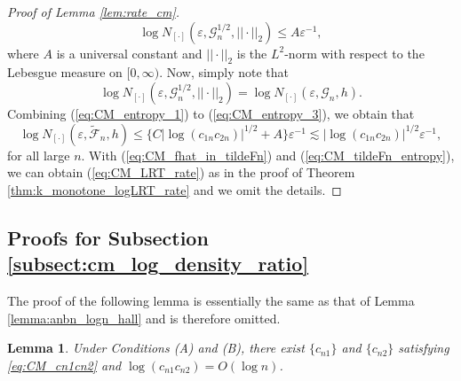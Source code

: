 \documentclass[12pt,letterpaper, twoside, openany]{article}
\theoremstyle{plain}
\newtheorem{lemma}[theorem]{Lemma}
\begin{document}
\begin{proof}[Proof of Lemma \ref{lem:rate_cm}]
\begin{equation}\label{eq:CM_entropy_2}
	\log N_{[\cdot]}(\varepsilon, 	\mathcal{G}^{1/2}_n, ||\cdot||_2) \leq A \varepsilon^{-1},
\end{equation}
where $A$ is a universal constant and $||\cdot||_2$ is the $L^2$-norm with respect to the Lebesgue measure on $[0, \infty)$. Now, simply note that
\begin{equation}\label{eq:CM_entropy_3}
	\log N_{[\cdot]}(\varepsilon, 	\mathcal{G}^{1/2}_n, ||\cdot||_2) = \log N_{[\cdot]}(\varepsilon, \mathcal{G}_n, h).
\end{equation}
Combining (\ref{eq:CM_entropy_1}) to (\ref{eq:CM_entropy_3}), we obtain that
\begin{equation}\label{eq:CM_tildeFn_entropy}
	\log N_{[\cdot]}(\varepsilon, 	\tilde{\mathcal{F}}_n, h) \leq  \{C |\log (c_{1n}c_{2n})|^{1/2} + A\} \varepsilon^{-1} \lesssim |\log (c_{1n}c_{2n})|^{1/2} \varepsilon^{-1},
\end{equation}
for all large $n$. With (\ref{eq:CM_fhat_in_tildeFn}) and (\ref{eq:CM_tildeFn_entropy}), we can obtain (\ref{eq:CM_LRT_rate}) as in the proof of Theorem \ref{thm:k_monotone_logLRT_rate} and we omit the details.	
\end{proof}



%

\subsection{Proofs for Subsection \ref{subsect:cm_log_density_ratio}}
The proof of the following lemma is essentially the same as that of Lemma \ref{lemma:anbn_logn_hall} and is therefore omitted.
\begin{lemma}\label{lemma:cn1cn2_logn_hall}
    Under Conditions (A) and (B), there exist $\{c_{n1}\}$ and $\{c_{n2}\}$ satisfying \eqref{eq:CM_cn1cn2} and $\log (c_{n1} c_{n2}) = O(\log n)$.
\end{lemma}
\end{document}
